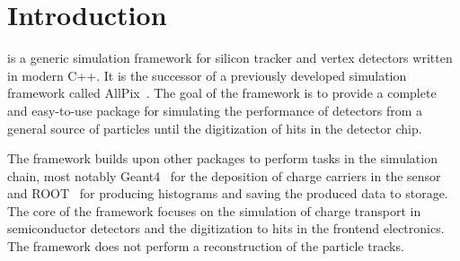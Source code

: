 \section{Introduction}
\label{sec:introduction}
\apsq is a generic simulation framework for silicon tracker and vertex detectors written in modern C++. It is the successor of a previously developed simulation framework called AllPix~\cite{ap1wiki,ap1git}. The goal of the \apsq framework is to provide a complete and easy-to-use package for simulating the performance of detectors from a general source of particles until the digitization of hits in the detector chip. 

The framework builds upon other packages to perform tasks in the simulation chain, most notably Geant4~\cite{geant4} for the deposition of charge carriers in the sensor and ROOT~\cite{root} for producing histograms and saving the produced data to storage. The core of the framework focuses on the simulation of charge transport in semiconductor detectors and the digitization to hits in the frontend electronics. The framework does not perform a reconstruction of the particle tracks.

